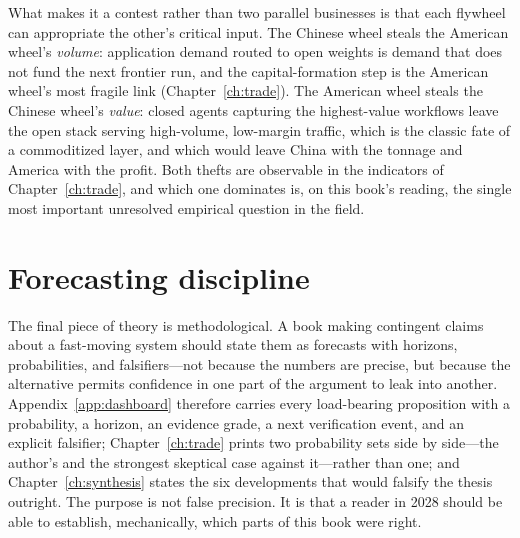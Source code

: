 

What makes it a contest rather than two parallel businesses is that each flywheel can appropriate the other's critical input. The Chinese wheel steals the American wheel's \emph{volume}: application demand routed to open weights is demand that does not fund the next frontier run, and the capital-formation step is the American wheel's most fragile link (Chapter~\ref{ch:trade}). The American wheel steals the Chinese wheel's \emph{value}: closed agents capturing the highest-value workflows leave the open stack serving high-volume, low-margin traffic, which is the classic fate of a commoditized layer, and which would leave China with the tonnage and America with the profit. Both thefts are observable in the indicators of Chapter~\ref{ch:trade}, and which one dominates is, on this book's reading, the single most important unresolved empirical question in the field.

\section{Forecasting discipline}
\label{sec:forecast}

The final piece of theory is methodological. A book making contingent claims about a fast-moving system should state them as forecasts with horizons, probabilities, and falsifiers---not because the numbers are precise, but because the alternative permits confidence in one part of the argument to leak into another. Appendix~\ref{app:dashboard} therefore carries every load-bearing proposition with a probability, a horizon, an evidence grade, a next verification event, and an explicit falsifier; Chapter~\ref{ch:trade} prints two probability sets side by side---the author's and the strongest skeptical case against it---rather than one; and Chapter~\ref{ch:synthesis} states the six developments that would falsify the thesis outright. The purpose is not false precision. It is that a reader in 2028 should be able to establish, mechanically, which parts of this book were right.
